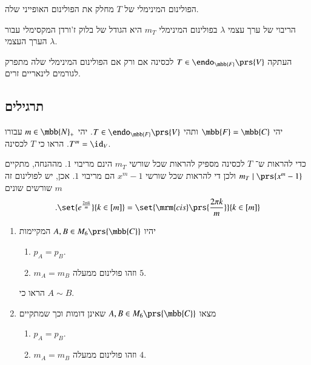 \documentclass[a4paper,10pt,oneside,openany]{article}
\begin{document}
\begin{corollary}
הפולינום המינימלי של
$T$
מחלק את הפולינום האופייני שלה.
\end{corollary}

\begin{fact}
הריבוי של ערך עצמי
$\lambda$
בפולינום המינימלי
$m_T$
היא הגודל של בלוק ז'ורדן המקסימלי עבור הערך העצמי
$\lambda$.
\end{fact}

\begin{corollary}
העתקה
$T \in \endo_{\mbb{F}}\prs{V}$
לכסינה אם ורק אם הפולינום המינימלי שלה מתפרק לגורמים לינאריים זרים.
\end{corollary}

\subsection{תרגילים}

\begin{exercise}
יהי
$\mbb{F} = \mbb{C}$
ותהי
$T \in \endo_{\mbb{F}}\prs{V}$.
יהי
$m \in \mbb{N}_+$
עבורו
$T^m = \id_V$.
הראו כי
$T$
לכסינה.
\end{exercise}

\begin{solution}
כדי להראות ש־%
$T$
לכסינה מספיק להראות שכל שורשי
$m_T$
הינם מריבוי
$1$.
מההנחה, מתקיים
$m_T \mid \prs{x^m - 1}$
ולכן די להראות שכל שורשי
$x^m - 1$
הם מריבוי
$1$.
אכן, יש לפולינום זה
$m$
שורשים שונים
\[\text{.} \set{e^{\frac{2 \pi i k}{m}}}{k \in [m]} = \set{\mrm{cis}\prs{\frac{2 \pi k}{m}}}{k \in [m]}\]
\end{solution}

\begin{exercise}
\begin{enumerate}
\item
יהיו
$A,B \in M_6\prs{\mbb{C}}$
המקיימות
\begin{enumerate}[label = (\roman*)]
\item $p_A = p_B$.
\item $m_A = m_B$
וזהו פולינום ממעלה
$5$.
\end{enumerate}
הראו כי
$A \sim B$.

\item
מצאו
$A,B \in M_6\prs{\mbb{C}}$
שאינן דומות וכך שמתקיים
\begin{enumerate}[label = (\roman*)]
\item $p_A = p_B$.
\item $m_A = m_B$
וזהו פולינום ממעלה
$4$.
\end{enumerate}
\end{enumerate}
\end{exercise}
\end{document}
